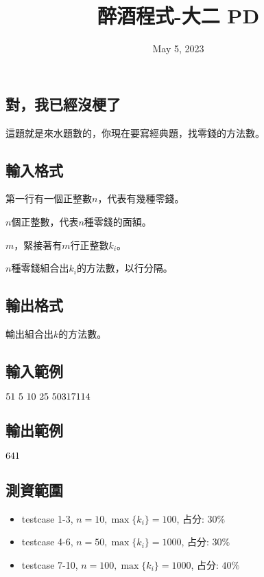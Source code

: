 \documentclass{article}
\title{醉酒程式-大二 PD}
\date{May 5, 2023}
\begin{document}
\begin{CJK*}{UTF8}{bsmi}

\maketitle

\section*{對，我已經沒梗了}

這題就是來水題數的，你現在要寫經典題，找零錢的方法數。

\subsection*{輸入格式}
第一行有一個正整數$n$，代表有幾種零錢。

$n$個正整數，代表$n$種零錢的面額。

$m$，緊接著有$m$行正整數$k_i$。

$n$種零錢組合出$k_i$的方法數，以行分隔。

\subsection*{輸出格式}
輸出組合出$k$的方法數。

\subsection*{輸入範例}
$5\\1\ 5\ 10\ 25\ 50\\3\\17\\11\\4$

\subsection*{輸出範例}
$6\\4\\1$

\subsection*{測資範圍}
\begin{itemize}
    \item testcase 1-3, $n=10,\max\{k_i\}=100$, 占分: $30\%$
    \item testcase 4-6, $n=50,\max\{k_i\}=1000$, 占分: $30\%$
    \item testcase 7-10, $n=100,\max\{k_i\}=1000$, 占分: $40\%$
\end{itemize}

\end{CJK*}
\end{document}

